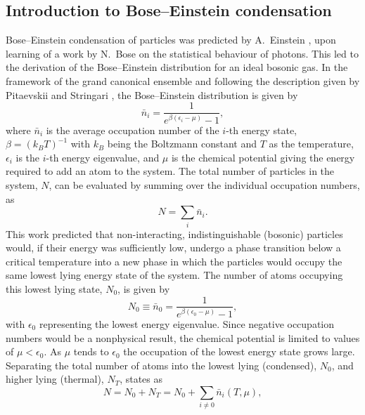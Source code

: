 \subsection{Introduction to Bose--Einstein condensation}\label{sub:becintro}
Bose--Einstein condensation of particles was predicted by A.~Einstein \cite{Einstein_bec_1925}, upon learning of a work by N.~Bose on the statistical behaviour of photons. This led to the derivation of the Bose--Einstein distribution for an ideal bosonic gas. In the framework of the grand canonical ensemble and following the description given by Pitaevskii and Stringari \cite[chap. 2]{BK:Pitaevskii_Stringari_2003}, the Bose--Einstein distribution is given by
\begin{equation}
\bar{n}_i = \frac{1}{e^{\beta(\epsilon_i - \mu)} -1},
\end{equation}
where $\bar{n}_i$ is the average occupation number of the $i$-th energy state, $\beta=(k_BT)^{-1}$ with $k_B$ being the Boltzmann constant and $T$ as the temperature, $\epsilon_i$ is the $i$-th energy eigenvalue, and $\mu$ is the chemical potential giving the energy required to add an atom to the system.
The total number of particles in the system, $N$, can be evaluated by summing over the individual occupation numbers, as
\begin{equation}
N=\displaystyle\sum_i \bar{n}_i.
\end{equation}
This work predicted that non-interacting, indistinguishable (bosonic) particles would, if their energy was sufficiently low, undergo a phase transition below a critical temperature into a new phase in which the particles would occupy the same lowest lying energy state of the system. The number of atoms occupying this lowest lying state, $N_0$, is given by
\begin{equation}
N_0 \equiv \bar{n}_0 = \frac{1}{e^{\beta(\epsilon_0 - \mu)} - 1},
\end{equation}
with $\epsilon_0$ representing the lowest energy eigenvalue. Since negative occupation numbers would be a nonphysical result, the chemical potential is limited to values of $\mu < \epsilon_0$. As $\mu$ tends to $\epsilon_0$ the occupation of the lowest energy state grows large. Separating the total number of atoms into the lowest lying (condensed), $N_0$, and higher lying (thermal), $N_T$, states as
\begin{equation}
N = N_0 + N_T = N_0 + \displaystyle\sum_{i\neq 0}\bar{n}_i(T,\mu),
\end{equation}

